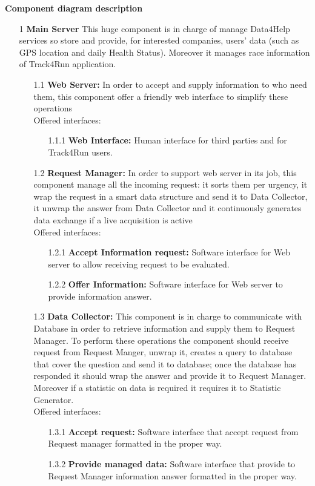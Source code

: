 {\large \textbf{Component diagram description}}
\begin{enumerate}
\item [1] \textbf{Main Server} 
This huge component is in charge of manage Data4Help services so store and provide, for interested companies, users’ data (such as GPS location and daily Health Status). Moreover it manages race information of Track4Run application.
	\begin{enumerate}
	\item [1.1] \textbf{Web Server:} In order to accept and supply information to who need them, this component offer a friendly web interface to simplify these operations\\Offered interfaces:
		\begin{enumerate}
		\item [1.1.1] \textbf{Web Interface:} Human interface for third parties and for Track4Run users.
		\end{enumerate}
		
	\item [1.2] \textbf{Request Manager:} In order to support web server in its job, this component manage all the incoming request: it sorts them per urgency, it wrap the request in a smart data structure and send it to Data Collector, it unwrap the answer from Data Collector and it continuously generates data exchange if a live acquisition is active\\Offered interfaces:
		\begin{enumerate}
		\item [1.2.1] \textbf{Accept Information request:} Software interface for Web server to allow receiving request to be evaluated.
		\item [1.2.2] \textbf{Offer Information:} Software interface for Web server to provide information answer.
		\end{enumerate}	
		
	\item [1.3] \textbf{Data Collector:} This component is in charge to communicate with Database in order to retrieve information and supply them to Request Manager. To perform these operations the component should receive request from Request Manger, unwrap it, creates a query to database that cover the question and send it to database; once the database has responded it should wrap the answer and provide it to Request Manager. Moreover if a statistic on data is required it requires it to Statistic Generator.\\Offered interfaces:
		\begin{enumerate}
		\item [1.3.1] \textbf{Accept request:} Software interface that accept request from Request manager formatted in the proper way.
		\item [1.3.2] \textbf{Provide managed data:} Software interface that provide to Request Manager information answer formatted in the proper way.
		\end{enumerate}	
		

\end{enumerate}
\end{enumerate}
